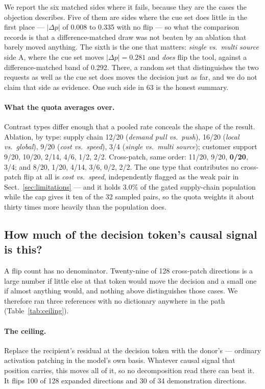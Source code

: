 \documentclass{article}
\begin{document}
We report the six matched sides where it fails, because they are the cases the objection describes. Five of them are sides where the cue set does little in the first place --- $|\Delta p|$ of 0.008 to 0.335 with no flip --- so what the comparison records is that a difference-matched draw was not beaten by an ablation that barely moved anything. The sixth is the one that matters: \emph{single vs.\ multi source} side A, where the cue set moves $|\Delta p| = 0.281$ and \emph{does} flip the tool, against a difference-matched band of 0.292. There, a random set that distinguishes the two requests as well as the cue set does moves the decision just as far, and we do not claim that side as evidence. One such side in 63 is the honest summary.

\paragraph{What the quota averages over.} Contrast types differ enough that a pooled rate conceals the shape of the result. Ablation, by type: supply chain 12/20 (\emph{demand pull vs.\ push}), 16/20 (\emph{local vs.\ global}), 9/20 (\emph{cost vs.\ speed}), 3/4 (\emph{single vs.\ multi source}); customer support 9/20, 10/20, 2/14, 4/6, 1/2, 2/2. Cross-patch, same order: 11/20, 9/20, \textbf{0/20}, 3/4; and 8/20, 1/20, 4/14, 3/6, 0/2, 2/2. The one type that contributes no cross-patch flip at all is \emph{cost vs.\ speed}, independently flagged as the weak pair in Sect.~\ref{sec:limitations} --- and it holds 3.0\% of the gated supply-chain population while the cap gives it ten of the 32 sampled pairs, so the quota weights it about thirty times more heavily than the population does.

\subsection{How much of the decision token's causal signal is this?}
\label{sec:ceiling}

A flip count has no denominator. Twenty-nine of 128 cross-patch directions is a large number if little else at that token would move the decision and a small one if almost anything would, and nothing above distinguishes those cases. We therefore ran three references with no dictionary anywhere in the path (Table~\ref{tab:ceiling}).

\paragraph{The ceiling.} Replace the recipient's residual at the decision token with the donor's --- ordinary activation patching in the model's own basis. Whatever causal signal that position carries, this moves all of it, so no decomposition read there can beat it. It flips 100 of 128 expanded directions and 30 of 34 demonstration directions.
\end{document}
